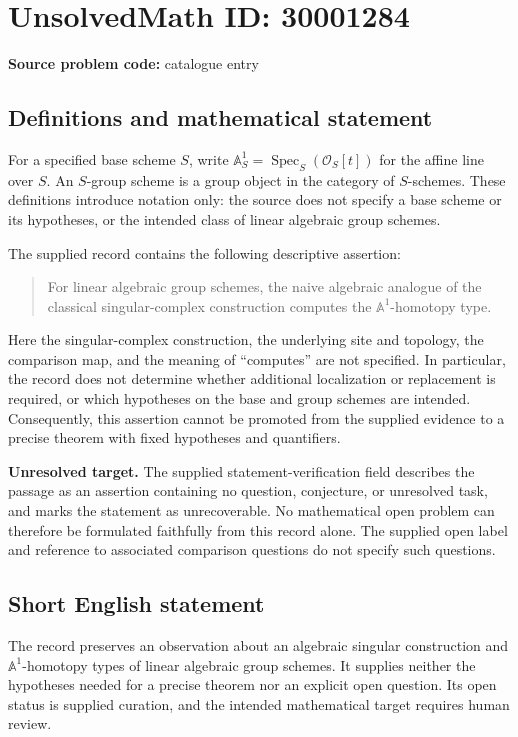 \documentclass[11pt]{article}
\newcommand{\A}{\mathbb{A}}
\begin{document}
\section*{UnsolvedMath ID: 30001284}
\textbf{Source problem code:} catalogue entry
\subsection{Definitions and mathematical statement}
For a specified base scheme \(S\), write \(\A^1_S=\operatorname{Spec}_S(\mathcal O_S[t])\) for the affine line over \(S\). An \(S\)-group scheme is a group object in the category of \(S\)-schemes. These definitions introduce notation only: the source does not specify a base scheme or its hypotheses, or the intended class of linear algebraic group schemes.

The supplied record contains the following descriptive assertion:
\begin{quote}
For linear algebraic group schemes, the naive algebraic analogue of the classical singular-complex construction computes the \(\A^1\)-homotopy type.
\end{quote}
Here the singular-complex construction, the underlying site and topology, the comparison map, and the meaning of ``computes'' are not specified. In particular, the record does not determine whether additional localization or replacement is required, or which hypotheses on the base and group schemes are intended. Consequently, this assertion cannot be promoted from the supplied evidence to a precise theorem with fixed hypotheses and quantifiers.

\textbf{Unresolved target.} The supplied statement-verification field describes the passage as an assertion containing no question, conjecture, or unresolved task, and marks the statement as unrecoverable. No mathematical open problem can therefore be formulated faithfully from this record alone. The supplied open label and reference to associated comparison questions do not specify such questions.
\subsection{Short English statement}
The record preserves an observation about an algebraic singular construction and \(\A^1\)-homotopy types of linear algebraic group schemes. It supplies neither the hypotheses needed for a precise theorem nor an explicit open question. Its open status is supplied curation, and the intended mathematical target requires human review.
\end{document}
